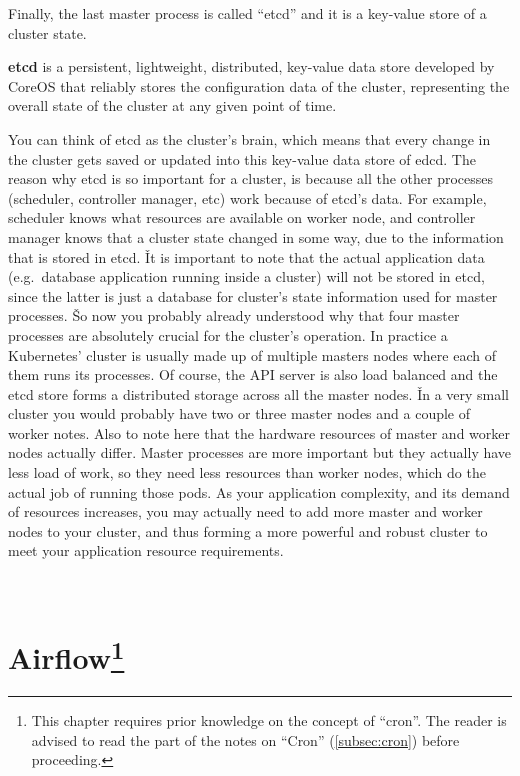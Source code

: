 Finally, the last master process is called ``etcd'' and it is a key-value store of a cluster state.

\bd[etcd]
\textbf{etcd} is a persistent, lightweight, distributed, key-value data store developed by CoreOS that reliably
stores the configuration data of the cluster, representing the overall state of the cluster at any given point of
time.
\ed


You can think of etcd as the cluster's brain, which means that every change in the cluster gets saved or updated into
this key-value data store of edcd. The reason why etcd is so important for a cluster, is because all the other
processes (scheduler, controller manager, etc) work because of etcd's data. For example, scheduler knows what
resources are available on worker node, and controller manager knows that a cluster state changed in some way, due to
the information that is stored in etcd. \v

It is important to note that the actual application data (e.g.\ database application running inside a cluster) will not
be stored in etcd, since the latter is just a database for cluster's state information used for master processes. \v

So now you probably already understood why that four master processes are absolutely crucial for the cluster's
operation. In practice a Kubernetes' cluster is usually made up of multiple masters nodes where each of them runs its
processes. Of course, the API server is also load balanced and the etcd store forms a distributed storage across all
the master nodes. \v

In a very small cluster you would probably have two or three master nodes and a couple of worker notes. Also to note
here that the hardware resources of master and worker nodes actually differ. Master processes are more important but
they actually have less load of work, so they need less resources than worker nodes, which do the actual job of
running those pods. As your application complexity, and its demand of resources increases, you may actually need to
add more master and worker nodes to your cluster, and thus forming a more powerful and robust cluster to meet your
application resource requirements.

~\section[Airflow] {Airflow\footnote{This chapter requires prior knowledge on the concept of ``cron''.
The reader is advised to read the part of the notes on ``Cron'' (\ref{subsec:cron}) before proceeding.}}

